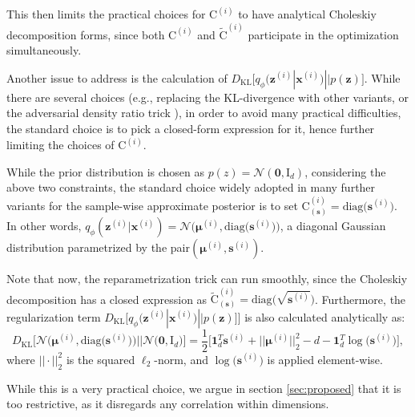 \documentclass{article}
\begin{document}
This then limits the practical choices for $\mathrm{C}^{(i)}$ to have analytical Choleskiy decomposition forms, since both $\mathrm{C}^{(i)}$ and $\tilde{\mathrm{C}}^{(i)}$ participate in the optimization simultaneously.

Another issue to address is the calculation of $D_{\text{KL}}\big[ q_{\phi}(\mathbf{z}^{(i)}  | \mathbf{x}^{(i)}) || p(\mathbf{z}) \big]$. While there are several choices (e.g., replacing the KL-divergence with other variants, or the adversarial density ratio trick \cite{nguyen2010estimating}), in order to avoid many practical difficulties, the standard choice is to pick a closed-form expression for it, hence further limiting the choices of $\mathrm{C}^{(i)}$.

While the prior distribution is chosen as $p(z) = \mathcal{N}(\mathbf{0}, \mathrm{I}_d)$, considering the above two constraints, the standard choice widely adopted in many further variants for the sample-wise approximate posterior is to set $\mathrm{C}_{(\mathbf{s})}^{(i)} = \text{diag} \big( \mathbf{s}^{(i)} \big)$. In other words,  $q_{\phi}(\mathbf{z}^{(i)}  | \mathbf{x}^{(i)}) = \mathcal{N} \big( \boldsymbol{\mu}^{(i)}, \text{diag} \big( \mathbf{s}^{(i)} \big)  \big)$, a diagonal Gaussian distribution parametrized by the pair$(\boldsymbol{\mu}^{(i)}, \mathbf{s}^{(i)})$.

Note that now, the reparametrization trick can run smoothly, since the Choleskiy decomposition has a closed expression as $\tilde{\mathrm{C}}_{(\mathbf{s})}^{(i)} = \text{diag} \big( \sqrt{\mathbf{s}^{(i)}} \big) $. Furthermore, the regularization term $D_{\text{KL}}\big[ q_{\phi}(\mathbf{z}^{(i)}  | \mathbf{x}^{(i)}) || p(\mathbf{z}) \big] \Big]$ is also calculated analytically as:
\begin{equation}  \label{eq:vae_KLD_loss}
D_{\text{KL}}\Big[ \mathcal{N} \Big( \boldsymbol{\mu}^{(i)}, \text{diag} \big( \mathbf{s}^{(i)} \big) \Big)    \Big|\Big|  \mathcal{N} \big( \mathbf{0}, \mathrm{I}_d \big)  \Big] = \frac{1}{2} \Big[ \mathbf{1}_d^T \mathbf{s}^{(i)} + \big|\big| \boldsymbol{\mu}^{(i)} \big|\big|_2^2 -d -  \mathbf{1}_d^T \log \big({\mathbf{s}^{(i)}} \big) \Big], 
\end{equation}
where $||\cdot||_2^2$ is the squared $\ell_2$-norm, and $\log \big({\mathbf{s}^{(i)}} \big)$ is applied element-wise.

While this is a very practical choice, we argue in section \ref{sec:proposed} that it is too restrictive, as it disregards any correlation within dimensions.
 
\end{document}
